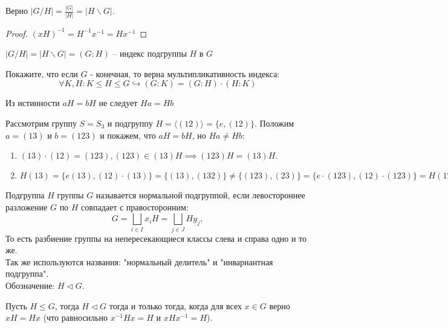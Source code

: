 \begin{proposition}
    Верно $|G/H| = \frac{|G|}{|H|} = |H \backslash G|$.
\end{proposition}

\begin{proof}
    $(xH)^{-1} = H^{-1}x^{-1} = Hx^{-1}$
\end{proof}

\begin{definition}
    $|G/H| = |H \backslash G| = (G : H)$ -- индекс подгруппы $H$ в $G$
\end{definition}

\begin{exercise}
    Покажите, что если $G$ - конечная, то верна мультипликативность индекса: $$\forall K, H: K 
    \leq H \leq G \hookrightarrow (G : K) = (G : H) \cdot (H : K)$$
\end{exercise}

\begin{note}
    Из истинности $aH = bH $ не следует $ Ha = Hb$
\end{note}

\begin{example}
    Рассмотрим группу $S = S_3$ и подгруппу $H = \langle(1 2)\rangle = \{e, (1 2)\}$. Положим $a = 
    (1 3)$ и $b = (1 2 3)$ и покажем,
    что $aH = bH$, но $Ha \neq Hb$:
    \begin{enumerate}
        \item $(1 3) \cdot (1 2) = (1 2 3), (1 2 3) \in (1 3)H \implies (1 2 3)H = (1 3)H.$ 
        \item $H(1 3) = \{e(1 3), (1 2) \cdot (1 3)\} = \{(1 3), (1 3 2)\} \neq  \{(1 2 3), (2 3)\} = 
        \{e \cdot (1 2 3), (1 2) \cdot (1 2 3)\} = H(1 2 3).$
    \end{enumerate}
\end{example}

\begin{definition}
    Подгруппа $H$ группы $G$ называется нормальной подгруппой, если левостороннее разложение $G$ 
    по $H$ совпадает с правосторонним:
    $$G = \bigsqcup_{i \in I} x_iH = \bigsqcup_{j \in J} Hy_j,$$ То есть разбиение группы на 
    непересекающиеся классы слева и справа одно и то же.\\
    Так же используются названия: "нормальный делитель" и "инвариантная подгруппа".\\
    Обозначение: $H \vartriangleleft G$.
\end{definition}

\begin{theorem}
    \label{th2.1}
    Пусть $H \leq G$, тогда $H \vartriangleleft G$ тогда и только тогда, когда для всех $x \in G$ верно 
    $xH = Hx$ (что равносильно $x^{-1}Hx = H$ и $xHx^{-1} = H$).
\end{theorem}

